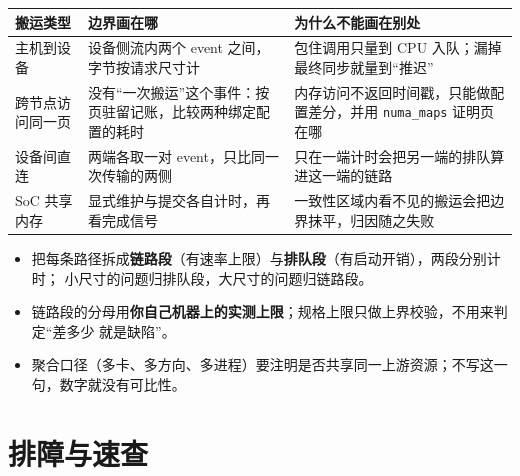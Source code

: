 \documentclass[12pt,a4paper,fontset=fandol]{ctexbook}
\newcommand{\Tp}[1]{\texttt{#1}}
\newcommand{\Bk}{\discretionary{}{}{}}
\begin{document}
\begin{compare}[title={四种``搬运''的计时边界该怎么画}]
\begin{tabular}{>{\raggedright\arraybackslash}p{} >{\raggedright\arraybackslash}p{} >{\raggedright\arraybackslash}p{}}
\toprule
搬运类型 & 边界画在哪 & 为什么不能画在别处 \\
\midrule
主机到设备 & 设备侧流内两个 event 之间，字节按请求尺寸计 & 包住调用只量到 CPU 入队；漏掉最终同步就量到``推迟'' \\
跨节点访问同一页 & 没有``一次搬运''这个事件：按页驻留记账，比较两种绑定配置的耗时 & 内存访问不返回时间戳，只能做配置差分，并用 \Tp{numa{\Bk}\_maps} 证明页在哪 \\
设备间直连 & 两端各取一对 event，只比同一次传输的两侧 & 只在一端计时会把另一端的排队算进这一端的链路 \\
SoC 共享内存 & 显式维护与提交各自计时，再看完成信号 & 一致性区域内看不见的搬运会把边界抹平，归因随之失败 \\
\bottomrule
\end{tabular}
\end{compare}

\begin{guideline}[title={搬运预算的记账法}]
\begin{itemize}
\item 把每条路径拆成\textbf{链路段}（有速率上限）与\textbf{排队段}（有启动开销），两段分别计时；
  小尺寸的问题归排队段，大尺寸的问题归链路段。
\item 链路段的分母用\textbf{你自己机器上的实测上限}；规格上限只做上界校验，不用来判定``差多少
  就是缺陷''。
\item 聚合口径（多卡、多方向、多进程）要注明是否共享同一上游资源；不写这一句，数字就没有可比性。
\end{itemize}
\end{guideline}

\section{排障与速查}
\label{sec:pm12-trouble}
\end{document}

